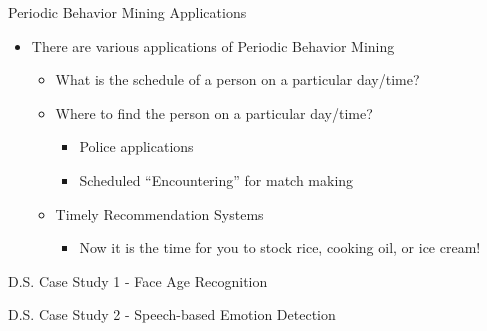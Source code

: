 \documentclass[
 size=14pt,
 paper=smartboard,  %
 mode=present, 		%
 display=slides, 	%
 style=tuliplab,  	%
 pauseslide,
 fleqn,leqno]{powerdot}
\begin{document}
\begin{slide}[toc=,bm=]{Periodic Behavior Mining Applications}

\begin{itemize}
\item
There are various applications of Periodic Behavior Mining

    \begin{itemize}
    \item
    What is the schedule of a person on a particular day/time?

    \item
    Where to find the person on a particular day/time?
        \begin{itemize}
        \item
        Police applications

        \item
        Scheduled ``Encountering'' for match making
        \end{itemize}
    \item
    Timely Recommendation Systems
        \begin{itemize}
        \item
        Now it is the time for you to stock rice, cooking oil, or ice cream!

        \end{itemize}

\end{itemize}

\end{itemize}

\end{slide}


\begin{slide}[toc=,bm=]{D.S. Case Study 1 - Face Age Recognition}


\end{slide}


\begin{slide}[toc=,bm=]{D.S. Case Study 2 - Speech-based Emotion Detection}


\end{slide}
\end{document}
